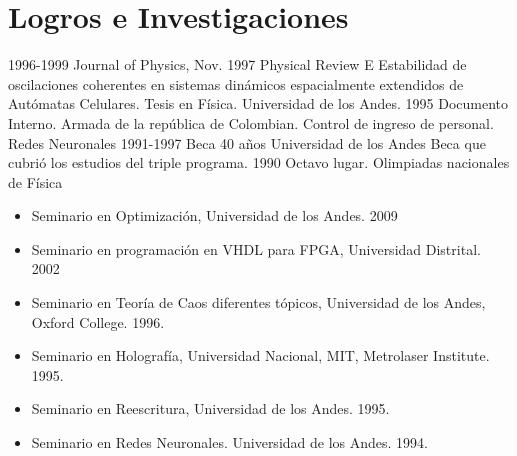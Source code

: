 \section{Logros e Investigaciones}

\begin{entrylist}
  \entry
	{1996-1999}
	{Journal of Physics, Nov. 1997}
	{Physical Review E}
	{Estabilidad de oscilaciones coherentes en sistemas dinámicos espacialmente extendidos de Autómatas Celulares.
	Tesis en Física. Universidad de los Andes.}
  \entry
	{1995}
	{Documento Interno.}
	{Armada de la república de Colombian.}
	{Control de ingreso de personal. Redes Neuronales}
  \entry
	{1991-1997}
	{Beca 40 años}
	{Universidad de los Andes}
	{Beca que cubrió los estudios del triple programa.}
  \entry
	{1990}
	{Octavo lugar.}
	{Olimpiadas nacionales de Física}
	{}
\end{entrylist}

\begin{itemize}
	\item Seminario en Optimización, Universidad de los Andes. 2009
	\item Seminario en programación en VHDL para FPGA, Universidad Distrital. 2002
	\item Seminario en Teoría de Caos diferentes tópicos, Universidad de los Andes, Oxford College. 1996.
	\item Seminario en Holografía, Universidad Nacional, MIT, Metrolaser Institute. 1995.
	\item Seminario en Reescritura, Universidad de los Andes. 1995.
	\item Seminario en Redes Neuronales. Universidad de los Andes. 1994.
\end{itemize}
